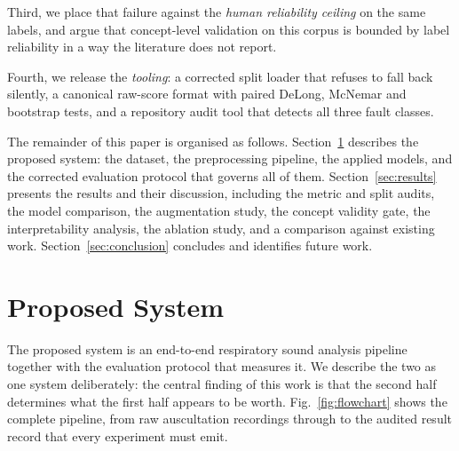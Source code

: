 \documentclass[journal,onecolumn]{IEEEtran}
\begin{document}
Third, we place that failure against the \emph{human reliability ceiling} on the same
labels, and argue that concept-level validation on this corpus is bounded by label
reliability in a way the literature does not report.

Fourth, we release the \emph{tooling}: a corrected split loader that refuses to fall
back silently, a canonical raw-score format with paired DeLong, McNemar and bootstrap
tests, and a repository audit tool that detects all three fault classes.

The remainder of this paper is organised as follows. Section~\ref{sec:proposed}
describes the proposed system: the dataset, the preprocessing pipeline, the applied
models, and the corrected evaluation protocol that governs all of them.
Section~\ref{sec:results} presents the results and their discussion, including the
metric and split audits, the model comparison, the augmentation study, the concept
validity gate, the interpretability analysis, the ablation study, and a comparison
against existing work. Section~\ref{sec:conclusion} concludes and identifies future
work.

\section{Proposed System}
\label{sec:proposed}

The proposed system is an end-to-end respiratory sound analysis pipeline together
with the evaluation protocol that measures it. We describe the two as one system
deliberately: the central finding of this work is that the second half determines
what the first half appears to be worth. Fig.~\ref{fig:flowchart} shows the complete
pipeline, from raw auscultation recordings through to the audited result record that
every experiment must emit.
\end{document}
